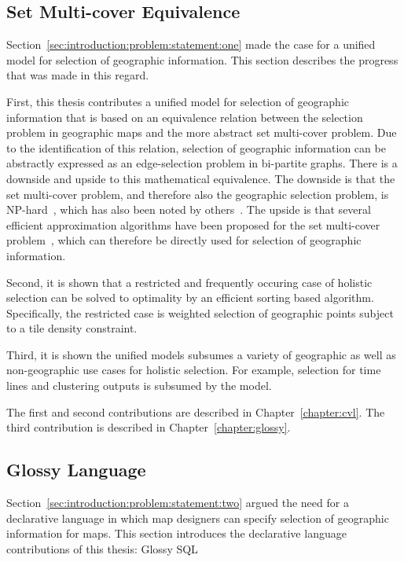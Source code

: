\documentclass[11pt, oneside]{report}
\begin{document}
{ 
\subsection{Set Multi-cover Equivalence}
\label{sec:introduction:contributions:set:multicover:problem}

Section~\ref{sec:introduction:problem:statement:one} made the case for a unified model for selection of geographic information. This section describes the progress that was made in this regard.

First, this thesis contributes a unified model for selection of geographic information that is based on an equivalence relation between the selection problem in geographic maps and the more abstract set multi-cover problem. Due to the identification of this relation, selection of geographic information can be abstractly expressed as an edge-selection problem in bi-partite graphs. There is a downside and upside to this mathematical equivalence. The downside is that the set multi-cover problem, and therefore also the geographic selection problem, is NP-hard~\cite{vazirani2001approximation}, which has also been noted by others~\cite{sarma2012fusiontables}. The upside is that several efficient approximation algorithms have been proposed for the set multi-cover problem~\cite{chekuri2012setmulticover,rajagopalan1998primal}, which can therefore be directly used for selection of geographic information.

Second, it is shown that a restricted and frequently occuring case of holistic selection can be solved to optimality by an efficient sorting based algorithm. Specifically, the restricted case is weighted selection of geographic points subject to a tile density constraint.

Third, it is shown the unified models subsumes a variety of geographic as well as non-geographic use cases for holistic selection. For example, selection for time lines and clustering outputs is subsumed by the model.

The first and second contributions are described in Chapter~\ref{chapter:cvl}. The third contribution is described in Chapter~\ref{chapter:glossy}.

\subsection{Glossy Language}
\label{sec:introduction:contributions:glossy}
Section~\ref{sec:introduction:problem:statement:two} argued the need for a declarative language in which map designers can specify selection of geographic information for maps. This section introduces the declarative language contributions of this thesis: Glossy SQL

}
\end{document}
